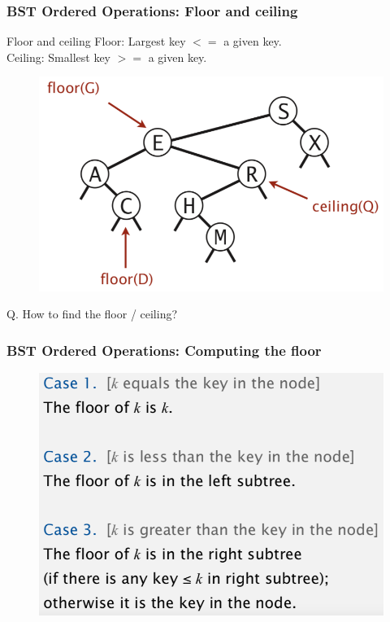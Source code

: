 \documentclass[11pt]{beamer}
\begin{document}
   \begin{frame}[fragile]
   	\frametitle{BST Ordered Operations:  Floor and ceiling}
     \begin{exampleblock}{ Floor and ceiling}
     	Floor: Largest key $<= $ a given key. \\
     	Ceiling: Smallest key $>=$ a given key.
     \end{exampleblock}
   	\begin{figure}
   		\centering
   		\includegraphics[width=0.5\linewidth]{"Screenshot 2020-11-03 at 11.01.57 PM"}
   		\caption{}
   		\label{fig:screenshot-2020-11-03-at-11}
   	\end{figure}
   	\alert{Q. How to find the floor / ceiling?}
   \end{frame}
   
    \begin{frame}[fragile]
	   	\frametitle{BST Ordered Operations:  Computing the floor}
	   \begin{figure}
	   	\centering
	   	\includegraphics[width=0.9\linewidth]{"Screenshot 2020-11-03 at 11.15.58 PM"}
	   	\label{fig:screenshot-2020-11-03-at-11}
	   \end{figure}
   \end{frame}
\end{document}
